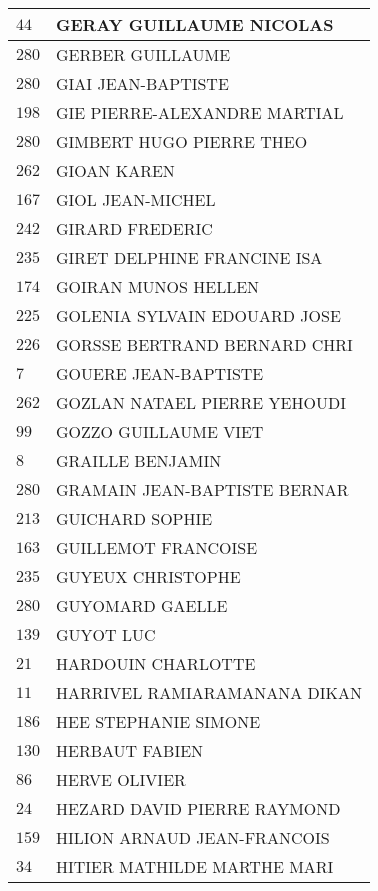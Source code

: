 \begin{xltabular}{\linewidth}{|l|X|}
    $44$ & GERAY GUILLAUME NICOLAS \\
    \hline
    $280$ & GERBER GUILLAUME \\
    \hline
    $280$ & GIAI JEAN-BAPTISTE \\
    \hline
    $198$ & GIE PIERRE-ALEXANDRE MARTIAL \\
    \hline
    $280$ & GIMBERT HUGO PIERRE THEO \\
    \hline
    $262$ & GIOAN KAREN \\
    \hline
    $167$ & GIOL JEAN-MICHEL \\
    \hline
    $242$ & GIRARD FREDERIC \\
    \hline
    $235$ & GIRET DELPHINE FRANCINE ISA \\
    \hline
    $174$ & GOIRAN MUNOS HELLEN \\
    \hline
    $225$ & GOLENIA SYLVAIN EDOUARD JOSE \\
    \hline
    $226$ & GORSSE BERTRAND BERNARD CHRI \\
    \hline
    $7$ & GOUERE JEAN-BAPTISTE \\
    \hline
    $262$ & GOZLAN NATAEL PIERRE YEHOUDI \\
    \hline
    $99$ & GOZZO GUILLAUME VIET \\
    \hline
    $8$ & GRAILLE BENJAMIN \\
    \hline
    $280$ & GRAMAIN JEAN-BAPTISTE BERNAR \\
    \hline
    $213$ & GUICHARD SOPHIE \\
    \hline
    $163$ & GUILLEMOT FRANCOISE \\
    \hline
    $235$ & GUYEUX CHRISTOPHE \\
    \hline
    $280$ & GUYOMARD GAELLE \\
    \hline
    $139$ & GUYOT LUC \\
    \hline
    $21$ & HARDOUIN CHARLOTTE \\
    \hline
    $11$ & HARRIVEL RAMIARAMANANA DIKAN \\
    \hline
    $186$ & HEE STEPHANIE SIMONE \\
    \hline
    $130$ & HERBAUT FABIEN \\
    \hline
    $86$ & HERVE OLIVIER \\
    \hline
    $24$ & HEZARD DAVID PIERRE RAYMOND \\
    \hline
    $159$ & HILION ARNAUD JEAN-FRANCOIS \\
    \hline
    $34$ & HITIER MATHILDE MARTHE MARI \\

\end{xltabular}
